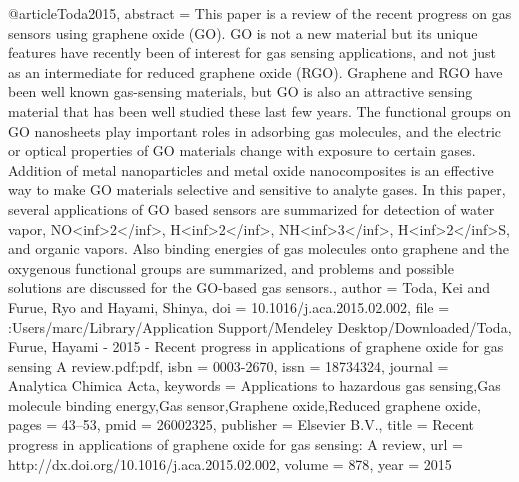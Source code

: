 @article{Toda2015,
abstract = {This paper is a review of the recent progress on gas sensors using graphene oxide (GO). GO is not a new material but its unique features have recently been of interest for gas sensing applications, and not just as an intermediate for reduced graphene oxide (RGO). Graphene and RGO have been well known gas-sensing materials, but GO is also an attractive sensing material that has been well studied these last few years. The functional groups on GO nanosheets play important roles in adsorbing gas molecules, and the electric or optical properties of GO materials change with exposure to certain gases. Addition of metal nanoparticles and metal oxide nanocomposites is an effective way to make GO materials selective and sensitive to analyte gases. In this paper, several applications of GO based sensors are summarized for detection of water vapor, NO{\textless}inf{\textgreater}2{\textless}/inf{\textgreater}, H{\textless}inf{\textgreater}2{\textless}/inf{\textgreater}, NH{\textless}inf{\textgreater}3{\textless}/inf{\textgreater}, H{\textless}inf{\textgreater}2{\textless}/inf{\textgreater}S, and organic vapors. Also binding energies of gas molecules onto graphene and the oxygenous functional groups are summarized, and problems and possible solutions are discussed for the GO-based gas sensors.},
author = {Toda, Kei and Furue, Ryo and Hayami, Shinya},
doi = {10.1016/j.aca.2015.02.002},
file = {:Users/marc/Library/Application Support/Mendeley Desktop/Downloaded/Toda, Furue, Hayami - 2015 - Recent progress in applications of graphene oxide for gas sensing A review.pdf:pdf},
isbn = {0003-2670},
issn = {18734324},
journal = {Analytica Chimica Acta},
keywords = {Applications to hazardous gas sensing,Gas molecule binding energy,Gas sensor,Graphene oxide,Reduced graphene oxide},
pages = {43--53},
pmid = {26002325},
publisher = {Elsevier B.V.},
title = {{Recent progress in applications of graphene oxide for gas sensing: A review}},
url = {http://dx.doi.org/10.1016/j.aca.2015.02.002},
volume = {878},
year = {2015}
}
